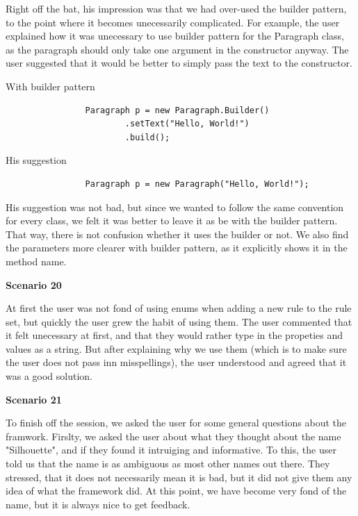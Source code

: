 \documentclass[12pt]{article}
\begin{document}
        Right off the bat, his impression was that we had over-used the builder pattern, to the point where it becomes unecessarily complicated. For example, the user explained how it was unecessary to use builder pattern for the Paragraph class, as the paragraph should only take one argument in the constructor anyway. The user suggested that it would be better to simply pass the text to the constructor.

        \begin{shaded}
            With builder pattern

            \begin{lstlisting}
                Paragraph p = new Paragraph.Builder()
                        .setText("Hello, World!")
                        .build();
            \end{lstlisting}

            His suggestion

            \begin{lstlisting}
                Paragraph p = new Paragraph("Hello, World!");
            \end{lstlisting}
        \end{shaded}

        His suggestion was not bad, but since we wanted to follow the same convention for every class, we felt it was better to leave it as be with the builder pattern. That way, there is not confusion whether it uses the builder or not. We also find the parameters more clearer with builder pattern, as it explicitly shows it in the method name.

        \textbf{Scenario 20}
        
        At first the user was not fond of using enums when adding a new rule to the rule set, but quickly the user grew the habit of using them. The user commented that it felt unecessary at first, and that they would rather type in the propeties and values as a string. But after explaining why we use them (which is to make sure the user does not pass inn misspellings), the user understood and agreed that it was a good solution.

        \textbf{Scenario 21}

        
                

        To finish off the session, we asked the user for some general questions about the framwork. Firslty, we asked the user about what they thought about the name "Silhouette", and if they found it intruiging and informative. To this, the user told us that the name is as ambiguous as most other names out there. They stressed, that it does not necessarily mean it is bad, but it did not give them any idea of what the framework did. At this point, we have become very fond of the name, but it is always nice to get feedback.
\end{document}
